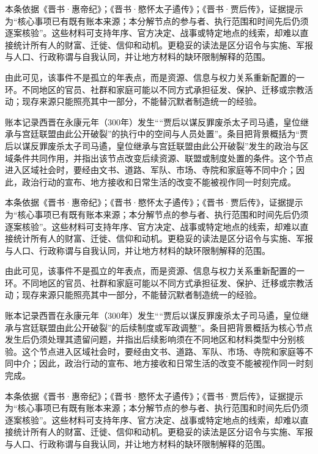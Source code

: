 本条依据《晋书·惠帝纪》；《晋书·愍怀太子遹传》；《晋书·贾后传》，证据提示为“核心事项已有既有账本来源；本分解节点的参与者、执行范围和时间先后仍须逐案核验”。这些材料可支持年序、官方决定、战事或特定地点的线索，却难以直接统计所有人的财富、迁徙、信仰和动机。更稳妥的读法是区分诏令与实施、军报与人口、行政称谓与自我认同，并让地方材料的缺环限制解释的范围。

由此可见，该事件不是孤立的年表点，而是资源、信息与权力关系重新配置的一环。不同地区的官员、社群和家庭可能以不同方式承担征发、保护、迁移或宗教活动；现存来源只能照亮其中一部分，不能替沉默者制造统一的经验。

账本记录西晋在永康元年（300年）发生““贾后以谋反罪废杀太子司马遹，皇位继承与宫廷联盟由此公开破裂”的执行中的空间与人员处置”。条目把背景概括为“贾后以谋反罪废杀太子司马遹，皇位继承与宫廷联盟由此公开破裂”发生的政治与区域条件共同作用，并指出该节点改变后续资源、联盟或制度处置的条件。这个节点进入区域社会时，要经由文书、道路、军队、市场、寺院和家庭等不同中介；因此，政治行动的宣布、地方接收和日常生活的改变不能被视作同一时刻完成。

本条依据《晋书·惠帝纪》；《晋书·愍怀太子遹传》；《晋书·贾后传》，证据提示为“核心事项已有既有账本来源；本分解节点的参与者、执行范围和时间先后仍须逐案核验”。这些材料可支持年序、官方决定、战事或特定地点的线索，却难以直接统计所有人的财富、迁徙、信仰和动机。更稳妥的读法是区分诏令与实施、军报与人口、行政称谓与自我认同，并让地方材料的缺环限制解释的范围。

由此可见，该事件不是孤立的年表点，而是资源、信息与权力关系重新配置的一环。不同地区的官员、社群和家庭可能以不同方式承担征发、保护、迁移或宗教活动；现存来源只能照亮其中一部分，不能替沉默者制造统一的经验。

账本记录西晋在永康元年（300年）发生““贾后以谋反罪废杀太子司马遹，皇位继承与宫廷联盟由此公开破裂”的后续制度或军政调整”。条目把背景概括为核心节点发生后仍须处理其遗留问题，并指出后续影响须在不同地区和材料类型中分别核验。这个节点进入区域社会时，要经由文书、道路、军队、市场、寺院和家庭等不同中介；因此，政治行动的宣布、地方接收和日常生活的改变不能被视作同一时刻完成。

本条依据《晋书·惠帝纪》；《晋书·愍怀太子遹传》；《晋书·贾后传》，证据提示为“核心事项已有既有账本来源；本分解节点的参与者、执行范围和时间先后仍须逐案核验”。这些材料可支持年序、官方决定、战事或特定地点的线索，却难以直接统计所有人的财富、迁徙、信仰和动机。更稳妥的读法是区分诏令与实施、军报与人口、行政称谓与自我认同，并让地方材料的缺环限制解释的范围。

